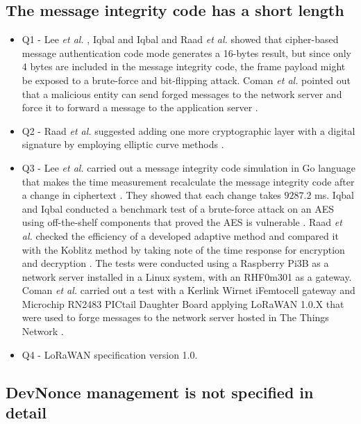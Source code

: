 \documentclass[manuscript,screen,review=false]{acmart}
\begin{document}
\subsection{The message integrity code has a short length}

\begin{itemize}
\item Q1 - Lee {\it et al.} \cite{40_countermeasure_bitflipping}, Iqbal and Iqbal \cite{64_AES_cryptography} and Raad {\it et al.} \cite{104_elliptic_curve_crypto} showed that cipher-based message authentication code mode generates a 16-bytes result, but since only 4 bytes are included in the message integrity code, the frame payload might be exposed to a brute-force and bit-flipping attack. Coman {\it et al.} pointed out that a malicious entity can send forged messages to the network server and force it to forward a message to the application server \cite{110_IoT_vulnerability_analysis}.

\item Q2 - Raad {\it et al.} suggested adding one more cryptographic layer with a digital signature by employing elliptic curve methods \cite{104_elliptic_curve_crypto}.

\item Q3 - Lee {\it et al.} carried out a message integrity code simulation in Go language that makes the time measurement recalculate the message integrity code after a change in ciphertext \cite{40_countermeasure_bitflipping}. They showed that each change takes $9287.2$ ms. Iqbal and Iqbal conducted a benchmark test of a brute-force attack on an AES using off-the-shelf components that proved the AES is vulnerable \cite{64_AES_cryptography}. Raad {\it et al.} checked the efficiency of a developed adaptive method and compared it with the Koblitz method by taking note of the time response for encryption and decryption \cite{104_elliptic_curve_crypto}. The tests were conducted using a Raspberry Pi3B as a network server installed in a Linux system, with an RHF0m301 as a gateway. Coman {\it et al.} carried out a test with a Kerlink Wirnet iFemtocell gateway and Microchip RN2483 PICtail Daughter Board applying LoRaWAN 1.0.X that were used to forge messages to the network server hosted in The Things Network \cite{110_IoT_vulnerability_analysis}.

\item Q4 - LoRaWAN specification version 1.0.
\end{itemize}

\subsection{DevNonce management is not specified in detail}
\end{document}

